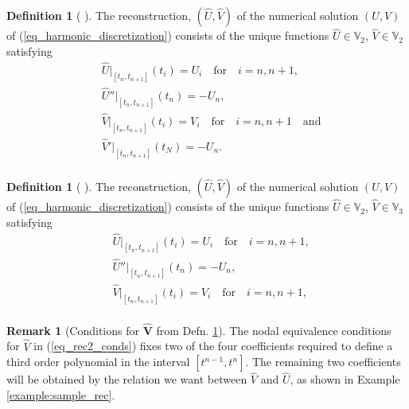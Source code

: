 \documentclass[12pt,a4paper]{article}
\numberwithin{equation}{section}
\theoremstyle{definition}
\newcommand{\qp}[1]{\left(#1\right)}
\newcommand{\qb}[1]{\left[#1\right]}
\newcommand{\rec}[1]{\widehat{{#1}}}
\newtheorem{Defn}[subsection]{Definition}
\newtheorem{Rem}[subsection]{Remark}
\begin{document}
\begin{Defn}[ ]\label{defn_our_rec}
	The reconstruction, $\qp{\rec{U},\rec{V}}$ of the numerical solution $\qp{U,V}$ of (\ref{eq_harmonic_discretization}) consists of the unique functions $\rec{U}\in \mathbb{V}_2$, $\rec{V}\in\mathbb{V}_2$ satisfying
	\begin{equation}
	\begin{aligned}
	&\rec{U}|_{\qb{t_n,t_{n+1}}}\qp{t_i}=U_i \quad \text{for}\quad i= n, n+1,\\
	&\rec{U}''|_{\qb{t_n,t_{n+1}}}\qp{t_n}=-U_n,\\
	&	\rec{V}|_{\qb{t_n,t_{n+1}}}\qp{t_{i}}=V_{i}\quad \text{for}\quad i= n, n+1\quad\text{and}\\
	&	\rec{V}'|_{\qb{t_n,t_{n+1}}}\qp{t_N}=-U_n.\\
	\end{aligned}
	\end{equation}
\end{Defn}
\begin{Defn}[ ]\label{defn_our_rec2}
	The reconstruction, $\qp{\rec{U},\rec{V}}$ of the numerical solution $\qp{U,V}$ of (\ref{eq_harmonic_discretization}) consists of the unique functions $\rec{U}\in \mathbb{V}_2$, $\rec{V}\in\mathbb{V}_3$ satisfying
	\begin{equation}\label{eq_rec2_conds}
	\begin{aligned}
	&\rec{U}|_{\qb{t_n,t_{n+1}}}\qp{t_i}=U_i \quad \text{for}\quad i= n, n+1,\\
	&\rec{U}''|_{\qb{t_n,t_{n+1}}}\qp{t_n}=-U_n,\\
     &\rec{V}|_{\qb{t_n,t_{n+1}}}\qp{t_i}=V_i \quad \text{for}\quad i= n, n+1,\\
	\end{aligned}
	\end{equation}
\end{Defn}
\begin{Rem}[Conditions for $\hat{\textbf{V}}$ from Defn. \ref{defn_our_rec2}]
	The nodal equivalence conditions for $\rec{V}$ in (\ref{eq_rec2_conds}) fixes two of the four coefficients required to define a third order polynomial in the interval $\qb{t^{n-1}, t^n}$.  The remaining two coefficients will be obtained by the relation we want between $\rec{V}$ and $\rec{U}$, as shown in Example \ref{example:sample_rec}.  
\end{Rem}
\end{document}
